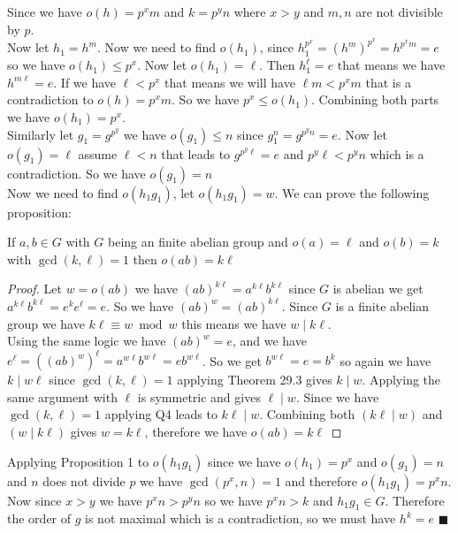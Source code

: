\documentclass[16pt,a4paper]{article}
\theoremstyle{definition}
\begin{document}
Since we have $o(h) = p^xm$ and $k= p^yn$ where $x > y$ and $m,n$ are not divisible by $p$. 
\\
Now let $h_1 = h^m$. Now we need to find $o(h_1)$, since $h_1^{p^x} = (h^m)^{p^x} = h^{p^xm} = e$ so we have $o(h_1)\leq p^x$. Now let $o(h_1) = \ell$. Then $h_1^\ell = e$ that means we have $h^{m\ell} = e$. If we have $\ell < p^x$ that means we will have $\ell m < p^xm$ that is a contradiction to $o(h) = p^xm$. So we have $p^x \leq o(h_1)$. Combining both parts we have $o(h_1) = p^x$. 
\\
Similarly let $g_1 = g^{p^y}$ we have $o(g_1)\leq n$ since $g_1^n = g^{p^yn} = e$. Now let $o(g_1) = \ell$ assume $\ell < n$ that leads to $g^{p^y\ell }=e$ and $p^y\ell < p^yn$ which is a contradiction. So we have $o(g_1) = n$
\\

Now we need to find $o(h_1g_1)$, let $o(h_1g_1)=w$. We can prove the following proposition:

\begin{prop}{}{}
 If $a,b \in G$ with $G$ being an finite abelian group and $o(a)=\ell$ and $o(b) = k$ with $\gcd(k,\ell) = 1$ then $o(ab) = k\ell$
\end{prop} 
\begin{proof}
Let $w = o(ab)$ we have $(ab)^{k\ell} = a^{k\ell}b^{k\ell}$ since $G$ is abelian we get $a^{k\ell}b^{k\ell} = e^ke^\ell = e$. So we have $(ab)^w = (ab)^{k\ell}$. Since $G$ is a finite abelian group we have $k\ell\equiv  w \bmod w$ this means we have $w\mid k \ell$. 
\\
Using the same logic we have $(ab)^w = e$, and we have $e^\ell = ((ab)^{w})^{\ell} = a^{w\ell}b^{w\ell} = e b^{w\ell}$. So we get $b^{w\ell} = e = b^k$ so again we have $k\mid w\ell$ since $\gcd(k,\ell) = 1$ applying Theorem 29.3 gives $k\mid w$. Applying the same argument with $\ell$ is symmetric and gives $\ell\mid w$. Since we have $\gcd(k,\ell) = 1$ applying Q4 leads to $k\ell \mid w$. Combining both $(k\ell \mid w)$ and $(w\mid k\ell)$ gives $w=k\ell$, therefore we have $o(ab) = k\ell$
\end{proof}


Applying Proposition 1  to $o(h_1g_1)$ since we have $o(h_1) = p^x$ and $o(g_1) = n$ and $n$ does not divide $p$ we have $\gcd(p^x, n) = 1$ and therefore $o(h_1g_1) = p^xn$. Now since $x>y$ we have $p^xn > p^yn$ so we have $p^xn> k$ and $h_1g_1 \in G$. Therefore the order of $g$ is not maximal which is a contradiction, so we must have $h^k = e$ $\blacksquare$ 
\end{document}

